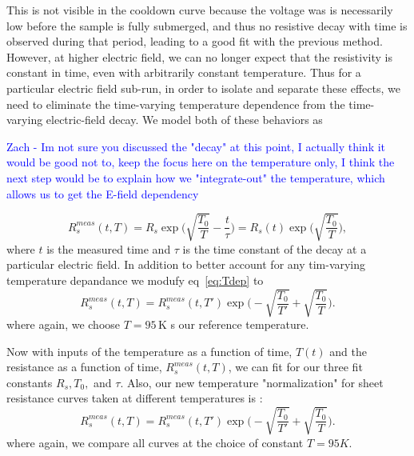 \documentclass[a4paper,12pt]{article}
\newcommand{\RI}[1]{\textcolor{blue}{#1}}
\begin{document}
This is not visible in the cooldown curve because the voltage was is necessarily low before the sample is fully submerged, and thus no resistive decay with time is observed during that period, leading to a good fit with the previous method. However, at higher electric field, we can no longer expect that the resistivity is constant in time, even with arbitrarily constant temperature. Thus for a particular electric field sub-run, in order to isolate and separate these effects, we need to eliminate the time-varying temperature dependence from the time-varying electric-field decay. We model both of these behaviors as 

\RI{Zach - Im not sure you discussed the "decay" at this point, I actually think it would be good not to, keep the focus here on the temperature only, I think the next step would be to explain how we "integrate-out" the temperature, which allows us to get the E-field dependency}


\begin{equation}
	R_{s}^{meas}(t,T)=R_s\exp\bigg(\sqrt{\frac{T_0}{T}}- \frac{t}{\tau}\bigg)=R_s(t)\exp\bigg(\sqrt{\frac{T_0}{T}}\bigg),
\end{equation}
where $t$ is the measured time and $\tau$ is the time constant of the decay at a particular electric field. In addition to better account for any tim-varying temperature depandance we modufy eq~\ref{eq:Tdep} to
\begin{equation}
	R_{s}^{meas}(t,T)=R_{s}^{meas}(t,T')\exp\bigg(-\sqrt{\frac{T_0}{T'}}+\sqrt{\frac{T_0}{T}}\bigg).
\end{equation}
where again, we choose $T=95$\,K s our reference temperature.

Now with inputs of the temperature as a function of time, $T(t)$ and the resistance as a function of time, $R_{s}^{meas}(t,T)$, we can fit for our three fit constants $R_s,T_0,$ and $\tau$.
Also, our new temperature "normalization" for sheet resistance curves taken at different temperatures is :
\begin{equation}
R_{s}^{meas}(t,T)=R_{s}^{meas}(t,T')\exp\bigg(-\sqrt{\frac{T_0}{T'}}+\sqrt{\frac{T_0}{T}}\bigg).
\end{equation}
where again, we compare all curves at the choice of constant $T=95K$.
\end{document}
